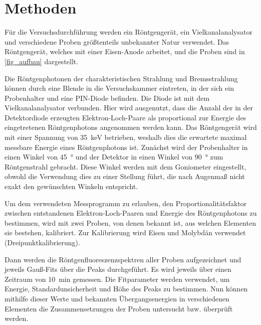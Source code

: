 \documentclass[
	a4paper,
	12pt,
	pagesize,
	ngerman
]{scrartcl}
\begin{document}
	
	\section{Methoden}
	Für die Versuchsdurchführung werden ein Röntgengerät, ein Vielkanalanalysator und verschiedene Proben größtenteils unbekannter Natur verwendet.
	Das Röntgengerät, welches mit einer Eisen-Anode arbeitet, und die Proben sind in \cref{fig_aufbau} dargestellt.
	
	Die Röntgenphotonen der charakteristischen Strahlung und Bremsstrahlung können durch eine Blende in die Versuchskammer eintreten, in der sich ein Probenhalter und eine PIN-Diode befinden.
	Die Diode ist mit dem Vielkanalanalysator verbunden.
	Hier wird ausgenutzt, dass die Anzahl der in der Detektordiode erzeugten Elektron-Loch-Paare als proportional zur Energie des eingetretenen Röntgenphotons angenommen werden kann.
	Das Röntgengerät wird mit einer Spannung von \SI{35}{\kilo \electronvolt} betrieben, weshalb dies die erwartete maximal messbare Energie eines Röntgenphotons ist.
	Zunächst wird der Probenhalter in einen Winkel von \SI{45}{\degree} und der Detektor in einen Winkel von \SI{90}{\degree} zum Röntgenstrahl gebracht.
	Diese Winkel werden mit dem Goniometer eingestellt, obwohl die Verwendung dies zu einer Stellung führt, die nach Augenmaß nicht exakt den gewünschten Winkeln entspricht. %
	
	Um dem verwendeten Messprogramm zu erlauben, den Proportionalitätsfaktor zwischen entstandenen Elektron-Loch-Paaren und Energie des Röntgenphotons zu bestimmen, wird mit zwei Proben, von denen bekannt ist, aus welchen Elementen sie bestehen, kalibriert.
	Zur Kalibrierung wird Eisen und Molybdän verwendet (Dreipunktkalibrierung).
	
	Dann werden die Röntgenfluoreszenzspektren aller Proben aufgezeichnet und jeweils Gauß-Fits über die Peaks durchgeführt.
	Es wird jeweils über einen Zeitraum von \SI{10}{\minute} gemessen.
	Die Fitparameter werden verwendet, um Energie, Standardunsicherheit und Höhe des Peaks zu bestimmen.
	Nun können mithilfe dieser Werte und bekannten Übergangsenergien in verschiedenen Elementen die Zusammensetzungen der Proben untersucht bzw. überprüft werden.
	
\end{document}
